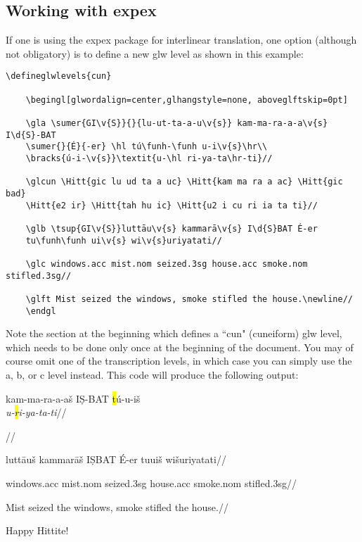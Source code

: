 \documentclass[12pt,A4]{article}
\begin{document}
\subsection{Working with expex}

If one is using the expex package for interlinear translation, one option (although not obligatory) is to define a new glw level as shown in this example:

\begin{verbatim}
\defineglwlevels{cun}

    \begingl[glwordalign=center,glhangstyle=none, aboveglftskip=0pt]
    
    \gla \sumer{GI\v{S}}{}{lu-ut-ta-a-u\v{s}} kam-ma-ra-a-a\v{s} I\d{S}-BAT 
    \sumer{}{É}{-er} \hl tú\funh-\funh u-i\v{s}\hr\\ 
    \bracks{ú-i-\v{s}}\textit{u-\hl ri-ya-ta\hr-ti}//
    
    \glcun \Hitt{gic lu ud ta a uc} \Hitt{kam ma ra a ac} \Hitt{gic bad} 
    \Hitt{e2 ir} \Hitt{tah hu ic} \Hitt{u2 i cu ri ia ta ti}//
    
    \glb \tsup{GI\v{S}}luttāu\v{s} kammarā\v{s} I\d{S}BAT É-er 
    tu\funh\funh ui\v{s} wi\v{s}uriyatati//
    
    \glc windows.acc mist.nom seized.3sg house.acc smoke.nom stifled.3sg//
    
    \glft Mist seized the windows, smoke stifled the house.\newline//
    \endgl
\end{verbatim}

Note the section at the beginning which defines a ``cun" (cuneiform) glw level, which needs to be done only once at the beginning of the document. You may of course omit one of the transcription levels, in which case you can simply use the a, b, or c level instead. This code will produce the following output:\\


    \begingl[glwordalign=center,glhangstyle=none, aboveglftskip=0pt]
    
    \gla {} kam-ma-ra-a-a\v{s} I\d{S}-BAT 
     \hl tú\funh-\funh u-i\v{s}\hr\\
    \textit{u-\hl ri-ya-ta\hr-ti}//
    
    \glcun {}     //
    
    \glb {}luttāu\v{s} kammarā\v{s} I\d{S}BAT É-er tu\funh\funh ui\v{s} wi\v{s}uriyatati//
    
    \glc windows.acc mist.nom seized.3sg house.acc smoke.nom stifled.3sg//
    
    \glft Mist seized the windows, smoke stifled the house.\newline//
    \endgl

\centerline{\Large Happy Hittite!}
\end{document}
